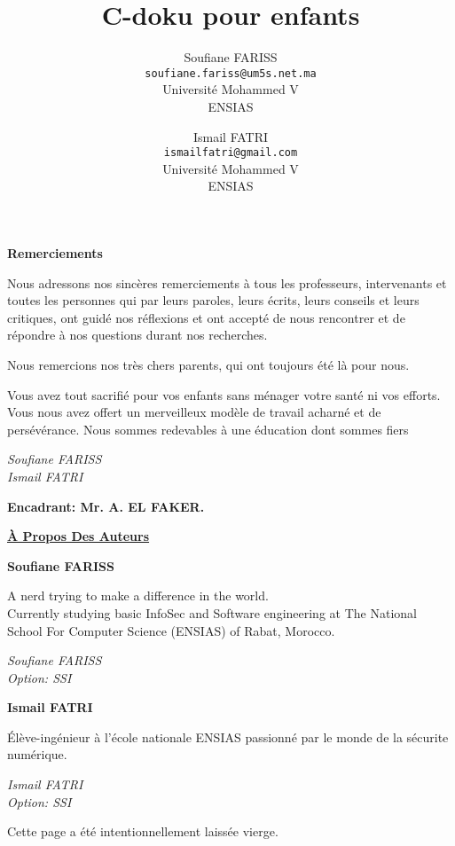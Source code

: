 \documentclass{article}
\begin{document}
\textbf{Remerciements} 

Nous adressons nos sincères remerciements à tous les professeurs, intervenants et toutes les personnes qui par leurs paroles, leurs écrits, leurs conseils et leurs critiques, ont guidé nos réflexions et ont accepté de nous rencontrer et de répondre à nos questions durant nos recherches.
 
Nous remercions nos très chers parents, qui ont toujours été là pour nous.
 
\epigraph{Vous avez tout sacrifié pour vos enfants sans ménager votre santé ni vos efforts. Vous nous avez offert un merveilleux modèle de travail acharné et de persévérance. Nous sommes redevables à une éducation dont sommes fiers}{\textit{Soufiane FARISS \\ Ismail FATRI}}

\textbf{Encadrant: Mr. A. EL FAKER.} 
\newpage


\begin{center}

  \uline{\bfseries À Propos Des Auteurs}\\

\end{center}

\textbf{Soufiane FARISS}
\epigraph{
A nerd trying to make a difference in the world.\\ 
Currently studying basic InfoSec and Software engineering at The National School For Computer Science (ENSIAS) of Rabat, Morocco.


}{\textit{Soufiane FARISS \\Option: SSI}}



\textbf{Ismail FATRI}
\epigraph{
Élève-ingénieur à l'école nationale ENSIAS passionné par le monde de la sécurite numérique.
}{\textit{Ismail FATRI \\Option: SSI}}

\newpage
\vspace*{\fill}
                \hfill
                \begin{center}
                Cette page a été intentionnellement laissée vierge.
                \end{center}
                \vspace{\fill}
                \thispagestyle{empty}

\newpage
\tableofcontents
\newpage
\title{C-doku pour enfants}

\author{
  Soufiane FARISS\\
  \texttt{soufiane.fariss@um5s.net.ma}
  \\Université Mohammed V\\ENSIAS
  \and
  Ismail FATRI\\
  \texttt{ismailfatri@gmail.com}
  \\Université Mohammed V\\ENSIAS
}
\end{document}

